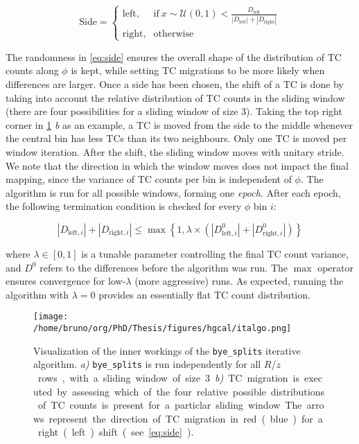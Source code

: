 \documentclass[11pt]{article}
\newcommand{\azimuth}{$\phi$}
\newcommand{\bsplits}{\texttt{bye\_splits}}
\newcommand{\rz}{$R$/$z$}
\begin{document}
\begin{equation}
\label{eq:side}
   \text{Side}=
   \begin{cases}
     \text{left}, & \text{if}\ x\sim\mathcal{U}(0,1) < \frac{D_{\text{left}}}{|D_{\text{left}}|+|D_{\text{right}}|} \\
     \text{right}, & \text{otherwise}
   \end{cases}
\end{equation}

The randomness in \cref{eq:side} ensures the overall shape of the distribution of \ac{TC} counts along \azimuth{} is kept, while setting \ac{TC} migrations to be more likely when differences are larger.
Once a side has been chosen, the shift of a \ac{TC} is done by taking into account the relative distribution of \ac{TC} counts in the sliding window (there are four possibilities for a sliding window of size 3).
Taking the top right corner in \cref{fig:italgo} \emph{b} as an example, a \ac{TC} is moved from the side to the middle whenever the central bin has less \acp{TC} than its two neighbours.
Only one \ac{TC} is moved per window iteration.
After the shift, the sliding window moves with unitary stride.
We note that the direction in which the window moves does not impact the final mapping, since the variance of \ac{TC} counts per bin is independent of \azimuth{}.
The algorithm is run for all possible windows, forming one \emph{epoch}.
After each epoch, the following termination condition is checked for every \azimuth{} bin \(i\):

\begin{equation}
\label{eq:termination}
  \left|D_{\text{left}, i}\right| + \left|D_{\text{right}, i}\right| \leq \max\left\{1, \lambda \times \left(\left|D^{0}_{\text{left}, i}\right| + \left|D^{0}_{\text{right}, i}\right| \right) \right\}
\end{equation}

\noindent where \(\lambda \in \left[0, 1\right]\) is a tunable parameter controlling the final \ac{TC} count variance, and \(D^0\) refers to the differences before the algorithm was run. The \(\max\) operator ensures convergence for low-\(\lambda\) (more aggressive) runs.
As expected, running the algorithm with \(\lambda=0\) provides an essentially flat \ac{TC} count distribution.

\begin{figure}
\texttt{[image: /home/bruno/org/PhD/Thesis/figures/hgcal/italgo.png]}
\caption{\label{fig:italgo}Visualization of the inner workings of the \bsplits{} iterative algorithm. \emph{a)} \bsplits{} is run independently for all \si{\rz} rows, with a sliding window of size 3. \emph{b)} \ac{TC} migration is executed by assessing which of the four relative possible distributions of \ac{TC} counts is present for a particlar sliding window. The arrows represent the direction of \ac{TC} migration in red (blue) for a right (left) shift (see \cref{eq:side}).}
\end{figure}
\end{document}

